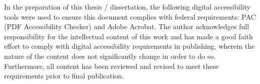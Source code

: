 
\indent In the preparation of this thesis / dissertation, the following
digital accessibility tools were used to ensure this document complies
with federal requirements: PAC (PDF Accessibility Checker) and Adobe
Acrobat. The author acknowledges full responsibility for the
intellectual content of this work and has made a good faith effort to
comply with digital accessibility requirements in publishing, wherein
the nature of the content does not significantly change in order to do
so. Furthermore, all content has been reviewed and revised to meet
these requirements prior to final publication.

